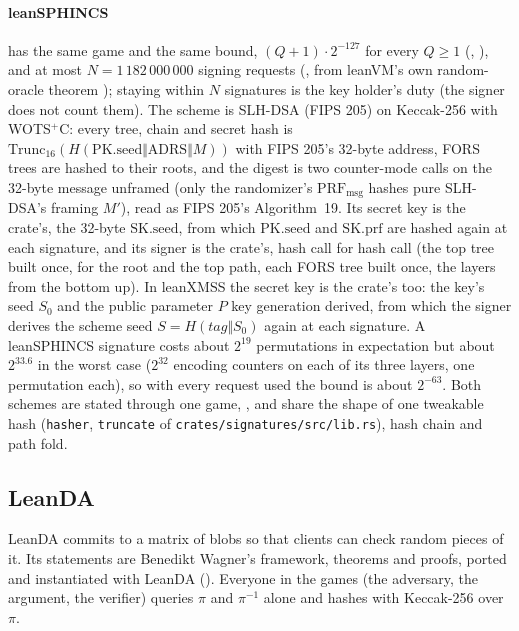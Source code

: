 \documentclass[11pt]{article}
\begin{document}
\paragraph{leanSPHINCS} has the same game and the same bound, $(Q+1)\cdot 2^{-127}$ for every
$Q \ge 1$ (, ), and
at most $N = 1\,182\,000\,000$ signing requests
(, from leanVM's own random-oracle theorem
); staying within $N$ signatures is the key holder's duty (the signer does not
count them). The scheme is SLH-DSA (FIPS 205) on Keccak-256 with WOTS$^+$C: every tree, chain and
secret hash is $\mathrm{Trunc}_{16}(H(\mathrm{PK.seed} \Vert \mathrm{ADRS} \Vert M))$ with FIPS 205's
32-byte address, FORS trees are hashed to their roots, and the digest is two counter-mode calls on
the 32-byte message unframed (only the randomizer's $\mathrm{PRF}_{\mathrm{msg}}$ hashes pure
SLH-DSA's framing $M'$), read as FIPS 205's Algorithm~19. Its secret key is the crate's, the
32-byte $\mathrm{SK.seed}$, from which $\mathrm{PK.seed}$ and $\mathrm{SK.prf}$ are hashed again at
each signature, and its signer is the
crate's, hash call for hash call (the top tree built once, for the root and the top path, each FORS
tree built once, the layers from the bottom up). In leanXMSS the secret key is the crate's too: the
key's seed $S_0$ and the public parameter $P$ key generation derived, from which the signer derives
the scheme seed $S = H(\mathit{tag} \Vert S_0)$ again at each signature. A leanSPHINCS signature
costs about $2^{19}$ permutations in expectation but about $2^{33.6}$ in the worst case ($2^{32}$
encoding counters on each of its three layers, one permutation each), so with every request used
the bound is about $2^{-63}$. Both schemes are stated through one game,
,
and share the shape of one tweakable hash (\texttt{hasher}, \texttt{truncate} of
\texttt{crates/signatures/src/lib.rs}), hash chain and path fold.

\subsection*{LeanDA}

LeanDA commits to a matrix of blobs so that clients can check random pieces of it. Its statements are
Benedikt Wagner's framework, theorems and proofs, ported and instantiated with LeanDA
(). Everyone in the games (the adversary, the argument, the verifier)
queries $\pi$ and $\pi^{-1}$ alone and hashes with Keccak-256 over $\pi$.
\end{document}
